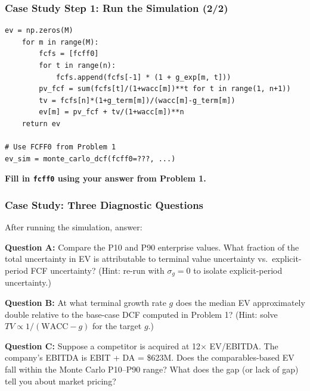 \documentclass[9pt,t]{beamer}
\begin{document}
\begin{frame}[fragile]
\frametitle{Case Study Step 1: Run the Simulation (2/2)}

\begin{lstlisting}[basicstyle=\ttfamily\scriptsize]
    ev = np.zeros(M)
    for m in range(M):
        fcfs = [fcff0]
        for t in range(n):
            fcfs.append(fcfs[-1] * (1 + g_exp[m, t]))
        pv_fcf = sum(fcfs[t]/(1+wacc[m])**t for t in range(1, n+1))
        tv = fcfs[n]*(1+g_term[m])/(wacc[m]-g_term[m])
        ev[m] = pv_fcf + tv/(1+wacc[m])**n
    return ev

# Use FCFF0 from Problem 1
ev_sim = monte_carlo_dcf(fcff0=???, ...)
\end{lstlisting}

\textbf{Fill in \texttt{fcff0} using your answer from Problem 1.}
\end{frame}

\begin{frame}
\frametitle{Case Study: Three Diagnostic Questions}

After running the simulation, answer:

\medskip
\textbf{Question A:} Compare the P10 and P90 enterprise values.
What fraction of the total uncertainty in EV is attributable to terminal value uncertainty
vs.\ explicit-period FCF uncertainty?
(Hint: re-run with $\sigma_g = 0$ to isolate explicit-period uncertainty.)

\medskip
\textbf{Question B:} At what terminal growth rate $g$ does the median EV
approximately double relative to the base-case DCF computed in Problem 1?
(Hint: solve $TV \propto 1/(\text{WACC}-g)$ for the target $g$.)

\medskip
\textbf{Question C:} Suppose a competitor is acquired at 12$\times$ EV/EBITDA.
The company's EBITDA is EBIT + DA = \$623M.
Does the comparables-based EV fall within the Monte Carlo P10--P90 range?
What does the gap (or lack of gap) tell you about market pricing?
\end{frame}
\end{document}
